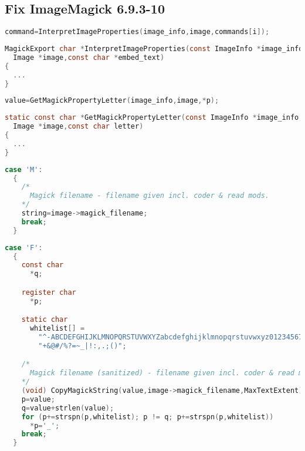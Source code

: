 \subsection{Fix ImageMagick 6.9.3-10}\label{subsec:fix-imagemagick-6.9.3-10}

\begin{lstlisting}[firstnumber=1295, language=C, caption=magick/delegate.c Aufruf InterpretImageProperties(),label={lst:lstlisting}]
command=InterpretImageProperties(image_info,image,commands[i]);
\end{lstlisting}
\vspace{5mm}

\begin{lstlisting}[firstnumber=3347, language=C, caption=magick/property.c InterpretImageProperties(),label={lst:lstlisting}]
MagickExport char *InterpretImageProperties(const ImageInfo *image_info,
  Image *image,const char *embed_text)
{
  ...
}
\end{lstlisting}
\vspace{5mm}

\begin{lstlisting}[firstnumber=3466, language=C, caption=magick/property.c Aufruf GetMagickPropertyLetter(),label={lst:lstlisting}]
  value=GetMagickPropertyLetter(image_info,image,*p);
\end{lstlisting}
\vspace{5mm}

\begin{lstlisting}[firstnumber=2343, language=C, caption=magick/property.c GetMagickPropertyLetter(),label={lst:lstlisting}]
static const char *GetMagickPropertyLetter(const ImageInfo *image_info,
  Image *image,const char letter)
{
  ...
}
\end{lstlisting}
\vspace{5mm}

\begin{lstlisting}[firstnumber=2627, language=C, caption=magick/property.c Ungefilterte Weitergabe M-Parameter,label={lst:lstlisting}]
  case 'M':
  {
    /*
      Magick filename - filename given incl. coder & read mods.
    */
    string=image->magick_filename;
    break;
  }
\end{lstlisting}
\vspace{5mm}

\begin{lstlisting}[firstnumber=2610, language=C, caption=magick/property.c Gefilterte Wietergabe F-Parameter,label={lst:lstlisting}]
  case 'F':
  {
    const char
      *q;

    register char
      *p;

    static char
      whitelist[] =
        "^-ABCDEFGHIJKLMNOPQRSTUVWXYZabcdefghijklmnopqrstuvwxyz0123456789"
        "+&@#/%?=~_|!:,.;()";

    /*
      Magick filename (sanitized) - filename given incl. coder & read mods.
    */
    (void) CopyMagickString(value,image->magick_filename,MaxTextExtent);
    p=value;
    q=value+strlen(value);
    for (p+=strspn(p,whitelist); p != q; p+=strspn(p,whitelist))
      *p='_';
    break;
  }
\end{lstlisting}
\vspace{5mm}